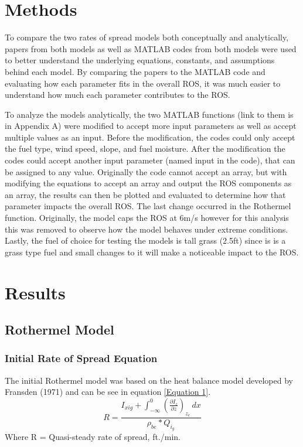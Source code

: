 \documentclass{article}
\begin{document}
\section{Methods}
To compare the two rates of spread models both conceptually and analytically, papers from both models as well as MATLAB codes from both models were used to better understand the underlying equations, constants, and assumptions behind each model. By comparing the papers to the MATLAB code and evaluating how each parameter fits in the overall ROS, it was much easier to understand how much each parameter contributes to the ROS. 


To analyze the models analytically, the two MATLAB functions (link to them is in Appendix A) were modified to accept more input parameters as well as accept multiple values as an input. Before the modification, the codes could only accept the fuel type, wind speed, slope, and fuel moisture. After the modification the codes could accept another input parameter (named input in the code), that can be assigned to any value. Originally the code cannot accept an array, but with modifying the equations to accept an array and output the ROS components as an array, the results can then be plotted and evaluated to determine how that parameter impacts the overall ROS. The last change occurred in the Rothermel function. Originally, the model caps the ROS at 6m/s however for this analysis this was removed to observe how the model behaves under extreme conditions. Lastly, the fuel of choice for testing the models is tall grass (2.5ft) since is is a grass type fuel and small changes to it will make a noticeable impact to the ROS. 

\section{Results}
\subsection{Rothermel Model}
\subsubsection{Initial Rate of Spread Equation}

The initial Rothermel model was based on the heat balance model developed by Fransden (1971) and can be see in equation \ref{Equation 1}. 
\begin{equation}
R = \frac {I_{xig} + \int_{-\infty}^{0} (\frac {\partial I_{z}} {\partial z})_{z_c}\,dx }{\rho_{be} * Q_{i_g}}
\label{Equation 1}
\end{equation}
Where R = Quasi-steady rate of spread, ft./min. \\
\end{document}
